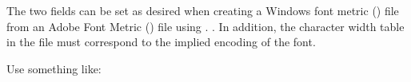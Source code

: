 The two fields can be set as desired when creating a Windows font metric
({\PFM}) file from an Adobe Font Metric ({\AFM}) file using {\AFMTOPFM}.%
.
%
% 
% 
% 
%
% 
% 
% 
% 
% 
%
%
% 
%
% 
% 
% 
%
In addition, the character width table in the {\PFM} file must
correspond to the implied encoding of the font. 

Use something like:

